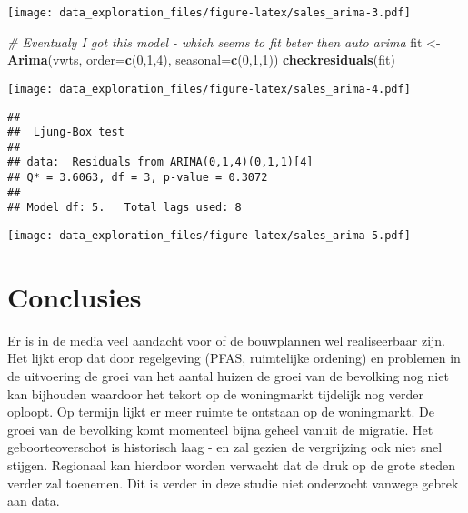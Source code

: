 \documentclass[
]{article}
\newenvironment{Shaded}{\begin{snugshade}}{\end{snugshade}}
\newcommand{\CommentTok}[1]{\textcolor[rgb]{0.56,0.35,0.01}{\textit{#1}}}
\newcommand{\DataTypeTok}[1]{\textcolor[rgb]{0.13,0.29,0.53}{#1}}
\newcommand{\DecValTok}[1]{\textcolor[rgb]{0.00,0.00,0.81}{#1}}
\newcommand{\KeywordTok}[1]{\textcolor[rgb]{0.13,0.29,0.53}{\textbf{#1}}}
\newcommand{\NormalTok}[1]{#1}
\newcommand{\OperatorTok}[1]{\textcolor[rgb]{0.81,0.36,0.00}{\textbf{#1}}}
\newcommand{\StringTok}[1]{\textcolor[rgb]{0.31,0.60,0.02}{#1}}
\begin{document}
\texttt{[image: data\_exploration\_files/figure-latex/sales\_arima-3.pdf]}

\begin{Shaded}
\begin{Highlighting}[]
\CommentTok{# Eventualy I got this model - which seems to fit beter then auto arima}
\NormalTok{fit <-}
\StringTok{  }\KeywordTok{Arima}\NormalTok{(vwts, }\DataTypeTok{order=}\KeywordTok{c}\NormalTok{(}\DecValTok{0}\NormalTok{,}\DecValTok{1}\NormalTok{,}\DecValTok{4}\NormalTok{), }\DataTypeTok{seasonal=}\KeywordTok{c}\NormalTok{(}\DecValTok{0}\NormalTok{,}\DecValTok{1}\NormalTok{,}\DecValTok{1}\NormalTok{))}
\KeywordTok{checkresiduals}\NormalTok{(fit)}
\end{Highlighting}
\end{Shaded}

\texttt{[image: data\_exploration\_files/figure-latex/sales\_arima-4.pdf]}

\begin{verbatim}
## 
##  Ljung-Box test
## 
## data:  Residuals from ARIMA(0,1,4)(0,1,1)[4]
## Q* = 3.6063, df = 3, p-value = 0.3072
## 
## Model df: 5.   Total lags used: 8
\end{verbatim}

\begin{Shaded}
\end{Shaded}

\texttt{[image: data\_exploration\_files/figure-latex/sales\_arima-5.pdf]}

\hypertarget{conclusies}{%
\section{Conclusies}\label{conclusies}}

Er is in de media veel aandacht voor of de bouwplannen wel realiseerbaar
zijn. Het lijkt erop dat door regelgeving (PFAS, ruimtelijke ordening)
en problemen in de uitvoering de groei van het aantal huizen de groei
van de bevolking nog niet kan bijhouden waardoor het tekort op de
woningmarkt tijdelijk nog verder oploopt. Op termijn lijkt er meer
ruimte te ontstaan op de woningmarkt. De groei van de bevolking komt
momenteel bijna geheel vanuit de migratie. Het geboorteoverschot is
historisch laag - en zal gezien de vergrijzing ook niet snel stijgen.
Regionaal kan hierdoor worden verwacht dat de druk op de grote steden
verder zal toenemen. Dit is verder in deze studie niet onderzocht
vanwege gebrek aan data.
\end{document}
